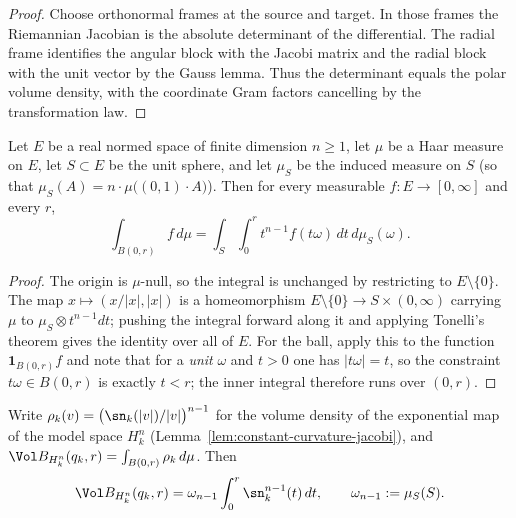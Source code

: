 \begin{proof}
\sketch
{}
Choose orthonormal frames at the source and target. In those frames the Riemannian Jacobian is the absolute determinant of the differential. The radial frame identifies the angular block with the Jacobi matrix and the radial block with the unit vector by the Gauss lemma. Thus the determinant equals the polar volume density, with the coordinate Gram factors cancelling by the transformation law.
\end{proof}


\begin{lemma}
\label{lem:polar-coordinates}
\leanok


Let $E$ be a real normed space of finite dimension $n\ge1$, let $\mu$ be a Haar
measure on $E$, let $S\subset E$ be the unit sphere, and let $\mu_S$ be the
induced measure on $S$ (so that $\mu_S(A)=n\cdot\mu\bigl((0,1)\cdot A\bigr)$).
Then for every measurable $f\colon E\to[0,\infty]$ and every $r$,
$$\int_{B(0,r)}f\,d\mu
=\int_{S}\int_0^r t^{n-1}f(t\omega)\,dt\,d\mu_S(\omega).$$
\end{lemma}

\begin{proof}
\sketch
\leanok
The origin is $\mu$-null, so the integral is unchanged by restricting to
$E\setminus\{0\}$. The map $x\mapsto(x/|x|,|x|)$ is a homeomorphism
$E\setminus\{0\}\to S\times(0,\infty)$ carrying $\mu$ to
$\mu_S\otimes t^{n-1}dt$; pushing the integral forward along it and applying
Tonelli's theorem gives the identity over all of $E$. For the ball, apply this
to the function $\mathbf 1_{B(0,r)}f$ and note that for a \emph{unit} $\omega$ and
$t>0$ one has $|t\omega|=t$, so the constraint $t\omega\in B(0,r)$ is exactly
$t<r$; the inner integral therefore runs over $(0,r)$.
\end{proof}

\begin{lemma}
\label{lem:model-ball-volume}



Write $\rho_k(v)=\bigl(\sn_k(|v|)/|v|\bigr)^{n-1}$ for the volume density of the
exponential map of the model space $H^n_k$ (Lemma~\ref{lem:constant-curvature-jacobi}),
and $\Vol B_{H^n_k}(q_k,r)=\int_{B(0,r)}\rho_k\,d\mu$. Then
$$\Vol B_{H^n_k}(q_k,r)=\omega_{n-1}\int_0^r\sn_k^{n-1}(t)\,dt,
\qquad \omega_{n-1}:=\mu_S(S).$$
\end{lemma}

